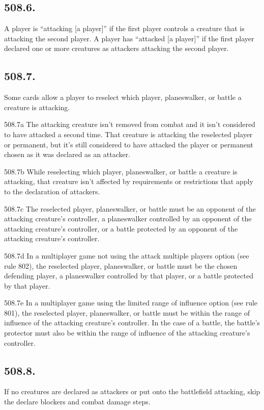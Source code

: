 \subsection*{508.6.}
A player is “attacking [a player]” if the first player controls a creature that is attacking the second player. A player has “attacked [a player]” if the first player declared one or more creatures as attackers attacking the second player.

\subsection*{508.7.}
Some cards allow a player to reselect which player, planeswalker, or battle a creature is attacking.

508.7a The attacking creature isn’t removed from combat and it isn’t considered to have attacked a second time. That creature is attacking the reselected player or permanent, but it’s still considered to have attacked the player or permanent chosen as it was declared as an attacker.

508.7b While reselecting which player, planeswalker, or battle a creature is attacking, that creature isn’t affected by requirements or restrictions that apply to the declaration of attackers.

508.7c The reselected player, planeswalker, or battle must be an opponent of the attacking creature’s controller, a planeswalker controlled by an opponent of the attacking creature’s controller, or a battle protected by an opponent of the attacking creature’s controller.

508.7d In a multiplayer game not using the attack multiple players option (see rule 802), the reselected player, planeswalker, or battle must be the chosen defending player, a planeswalker controlled by that player, or a battle protected by that player.

508.7e In a multiplayer game using the limited range of influence option (see rule 801), the reselected player, planeswalker, or battle must be within the range of influence of the attacking creature’s controller. In the case of a battle, the battle’s protector must also be within the range of influence of the attacking creature’s controller.

\subsection*{508.8.}
If no creatures are declared as attackers or put onto the battlefield attacking, skip the declare blockers and combat damage steps.

